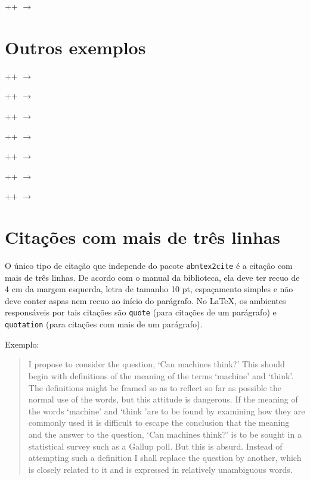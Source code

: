 \documentclass[xindy,rascunho]{fei}
\begin{document}
\begin{teorema}
	\latexinline+\citeyear{galilei_dialogue_1953}+ \(\to\) \citeyear{galilei_dialogue_1953}

	\section{Outros exemplos}

	\latexinline++ \(\to\) 

	\latexinline++ \(\to\) 

	\latexinline++ \(\to\) 

	\latexinline++ \(\to\) 

	\latexinline++ \(\to\) 

	\latexinline++ \(\to\) 

	\latexinline++ \(\to\) 
	
	\section{Citações com mais de três linhas}
	
	O único tipo de citação que independe do pacote \texttt{abntex2cite} é a citação com mais de três linhas. De acordo com o manual da biblioteca, ela deve ter recuo de 4 cm da margem esquerda, letra de tamanho 10 pt, espaçamento simples e não deve conter aspas nem recuo ao início do parágrafo. No \LaTeX, os ambientes responsáveis por tais citações são \texttt{quote} (para citações de um parágrafo) e \texttt{quotation} (para citações com mais de um parágrafo).
	
	Exemplo:
	
	\begin{quote}		
	I propose to consider the question, `Can machines think?' This should begin with definitions of the meaning of the terms `machine' and `think'. The definitions might be framed so as to reflect so far as possible the normal use of the words, but this attitude is dangerous. If the meaning of the words `machine' and `think 'are to be found by examining how they are commonly used it is difficult to escape the conclusion that the meaning and the answer to the question, `Can machines think?' is to be sought in a statistical survey such as a Gallup poll. But this is absurd. Instead of attempting such a definition I shall replace the question by another, which is closely related to it and is expressed in relatively unambiguous words. \cite{j:turing50}
	\end{quote}


\end{teorema}
\end{document}
